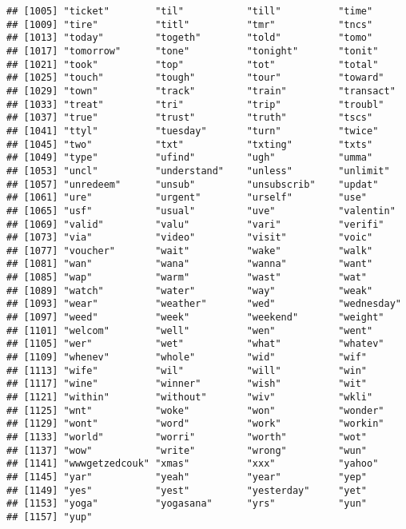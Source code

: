 \documentclass[]{article}
\begin{document}
\begin{verbatim}
## [1005] "ticket"        "til"           "till"          "time"         
## [1009] "tire"          "titl"          "tmr"           "tncs"         
## [1013] "today"         "togeth"        "told"          "tomo"         
## [1017] "tomorrow"      "tone"          "tonight"       "tonit"        
## [1021] "took"          "top"           "tot"           "total"        
## [1025] "touch"         "tough"         "tour"          "toward"       
## [1029] "town"          "track"         "train"         "transact"     
## [1033] "treat"         "tri"           "trip"          "troubl"       
## [1037] "true"          "trust"         "truth"         "tscs"         
## [1041] "ttyl"          "tuesday"       "turn"          "twice"        
## [1045] "two"           "txt"           "txting"        "txts"         
## [1049] "type"          "ufind"         "ugh"           "umma"         
## [1053] "uncl"          "understand"    "unless"        "unlimit"      
## [1057] "unredeem"      "unsub"         "unsubscrib"    "updat"        
## [1061] "ure"           "urgent"        "urself"        "use"          
## [1065] "usf"           "usual"         "uve"           "valentin"     
## [1069] "valid"         "valu"          "vari"          "verifi"       
## [1073] "via"           "video"         "visit"         "voic"         
## [1077] "voucher"       "wait"          "wake"          "walk"         
## [1081] "wan"           "wana"          "wanna"         "want"         
## [1085] "wap"           "warm"          "wast"          "wat"          
## [1089] "watch"         "water"         "way"           "weak"         
## [1093] "wear"          "weather"       "wed"           "wednesday"    
## [1097] "weed"          "week"          "weekend"       "weight"       
## [1101] "welcom"        "well"          "wen"           "went"         
## [1105] "wer"           "wet"           "what"          "whatev"       
## [1109] "whenev"        "whole"         "wid"           "wif"          
## [1113] "wife"          "wil"           "will"          "win"          
## [1117] "wine"          "winner"        "wish"          "wit"          
## [1121] "within"        "without"       "wiv"           "wkli"         
## [1125] "wnt"           "woke"          "won"           "wonder"       
## [1129] "wont"          "word"          "work"          "workin"       
## [1133] "world"         "worri"         "worth"         "wot"          
## [1137] "wow"           "write"         "wrong"         "wun"          
## [1141] "wwwgetzedcouk" "xmas"          "xxx"           "yahoo"        
## [1145] "yar"           "yeah"          "year"          "yep"          
## [1149] "yes"           "yest"          "yesterday"     "yet"          
## [1153] "yoga"          "yogasana"      "yrs"           "yun"          
## [1157] "yup"
\end{verbatim}
\end{document}
